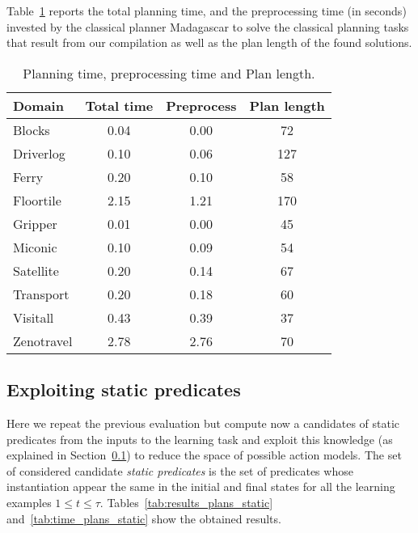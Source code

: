 \documentclass[letterpaper]{article} %
\begin{document}
Table~\ref{tab:time_plans} reports the total planning time, and the preprocessing time (in seconds) invested by the classical planner {\sc Madagascar} to solve the classical planning tasks that result from our compilation as well as the plan length of the found solutions. 	

\begin{table}[hbt!]
\begin{small}
	\begin{center}
		\begin{tabular}{l|c|c|c|}			 
			Domain & Total time & Preprocess & Plan length  \\
			\hline
			Blocks & 0.04 & 0.00 & 72 \\
			Driverlog & 0.10 & 0.06 & 127 \\
			Ferry & 0.20 & 0.10 & 58 \\
			Floortile & 2.15 & 1.21 & 170 \\
			Gripper & 0.01 & 0.00 & 45 \\
			Miconic & 0.10 & 0.09 & 54 \\
			Satellite & 0.20 & 0.14 & 67 \\
			Transport & 0.20 & 0.18 & 60 \\
			Visitall & 0.43 & 0.39 & 37 \\
			Zenotravel & 2.78 & 2.76 & 70			
		\end{tabular}
	\end{center}
        \end{small}
	\caption{\small Planning time, preprocessing time and Plan length.}
	\label{tab:time_plans}	
\end{table}

\subsection{Exploiting static predicates}
Here we repeat the previous evaluation but compute now a candidates of static predicates from the inputs to the learning task and exploit this knowledge (as explained in Section~\ref{}) to reduce the space of possible action models. The set of considered candidate {\em static predicates} is the set of predicates whose instantiation appear the same in the initial and final states for all the learning examples {\small $1\leq t\leq \tau$}. Tables~\ref{tab:results_plans_static} and~\ref{tab:time_plans_static} show the obtained results.	
\end{document}
